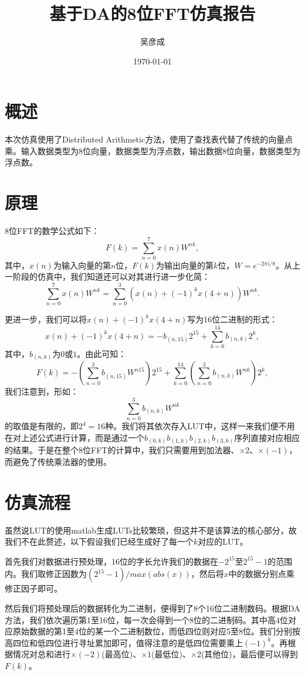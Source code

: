 \documentclass[a4paper, 12pt]{ctexart}
\title{基于DA的8位FFT仿真报告}
\author{吴彦成}
\date{\today}
\begin{document}
\maketitle
\section{概述}

本次仿真使用了Distributed Arithmetic方法，使用了查找表代替了传统的向量点乘。输入数据类型为8位向量，数据类型为浮点数，输出数据8位向量，数据类型为浮点数。

\section{原理}

8位FFT的数学公式如下：
$$F(k) = \sum_{n = 0}^{7} x(n)W^{nk},$$
其中，$x(n)$为输入向量的第$n$位，$F(k)$为输出向量的第$k$位，$W = e^{-2\pi i / 8}$。从上一阶段的仿真中，我们知道还可以对其进行进一步化简：
$$\sum_{n = 0}^{7} x(n)W^{nk} = \sum_{n = 0}^{3} (x(n) + (-1)^k x(4 + n)) W^{nk}.$$

更进一步，我们可以将$x(n) + (-1)^k x(4 + n)$写为16位二进制的形式：
$$x(n) + (-1)^k x(4 + n) = -b_{(n,15)} 2^{15} + \sum_{k = 0}^{14} b_{(n,k)} 2^k,$$
其中，$b_{(n,k)}$为$0$或$1$。由此可知：
$$F(k) = -(\sum_{n = 0}^{3} b_{(n,15)} W^{n15})2^{15} + \sum_{k = 0}^{14} (\sum_{n = 0}^{3} b_{(n,k)} W^{nk})2^k,$$
我们注意到，形如：
$$\sum_{n = 0}^{3} b_{(n,k)} W^{nk}$$
的取值是有限的，即$2^4 = 16$种。我们将其依次存入LUT中，这样一来我们便不用在对上述公式进行计算，而是通过一个$b_{(0,k)}b_{(1,k)}b_{(2,k)}b_{(3,k)}$序列直接对应相应的结果。于是在整个8位FFT的计算中，我们只需要用到加法器、$\times 2$、$\times (-1)$，而避免了传统乘法器的使用。

\section{仿真流程}

虽然说LUT的使用matlab生成LUTs比较繁琐，但这并不是该算法的核心部分，故我们不在此赘述，以下假设我们已经生成好了每一个$k$对应的LUT。

首先我们对数据进行预处理，16位的字长允许我们的数据在$-2^{15}$至$2^{15} - 1$的范围内。我们取修正因数为$(2^{15} - 1) / max(abs(x))$，然后将$x$中的数据分别点乘修正因子即可。

然后我们将预处理后的数据转化为二进制，便得到了8个16位二进制数码。根据DA方法，我们依次遍历第1至16位，每一次会得到一个8位的二进制码。其中高4位对应原始数据的第1至4位的某一个二进制数位，而低四位则对应5至8位。我们分别按高四位和低四位进行寻址累加即可，值得注意的是低四位需要乘上$(-1)^k$。再根据情况对总和进行$\times (-2) $(最高位)、$\times 1$(最低位)、$\times 2$(其他位)，最后便可以得到$F(k)$。
\end{document}
